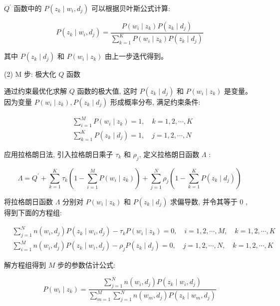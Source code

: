 \documentclass[10pt]{article}
\begin{document}
$Q^{\prime}$ 函数中的 $P\left(z_{k} \mid w_{i}, d_{j}\right)$ 可以根据贝叶斯公式计算:


\begin{equation*}
P\left(z_{k} \mid w_{i}, d_{j}\right)=\frac{P\left(w_{i} \mid z_{k}\right) P\left(z_{k} \mid d_{j}\right)}{\sum_{k=1}^{K} P\left(w_{i} \mid z_{k}\right) P\left(z_{k} \mid d_{j}\right)} \tag{18.11}
\end{equation*}


其中 $P\left(z_{k} \mid d_{j}\right)$ 和 $P\left(w_{i} \mid z_{k}\right)$ 由上一步迭代得到。

(2) $\mathrm{M}$ 步: 极大化 $Q$ 函数

通过约束最优化求解 $Q$ 函数的极大值, 这时 $P\left(z_{k} \mid d_{j}\right)$ 和 $P\left(w_{i} \mid z_{k}\right)$ 是变量。因为变量 $P\left(w_{i} \mid z_{k}\right), P\left(z_{k} \mid d_{j}\right)$ 形成概率分布, 满足约束条件:

$$
\begin{aligned}
& \sum_{i=1}^{M} P\left(w_{i} \mid z_{k}\right)=1, \quad k=1,2, \cdots, K \\
& \sum_{k=1}^{K} P\left(z_{k} \mid d_{j}\right)=1, \quad j=1,2, \cdots, N
\end{aligned}
$$

应用拉格朗日法, 引入拉格朗日乘子 $\tau_{k}$ 和 $\rho_{j}$, 定义拉格朗日函数 $\Lambda$ :

$$
\Lambda=Q^{\prime}+\sum_{k=1}^{K} \tau_{k}\left(1-\sum_{i=1}^{M} P\left(w_{i} \mid z_{k}\right)\right)+\sum_{j=1}^{N} \rho_{j}\left(1-\sum_{k=1}^{K} P\left(z_{k} \mid d_{j}\right)\right)
$$

将拉格朗日函数 $\Lambda$ 分别对 $P\left(w_{i} \mid z_{k}\right)$ 和 $P\left(z_{k} \mid d_{j}\right)$ 求偏导数, 并令其等于 0 , 得到下面的方程组:

$$
\begin{aligned}
& \sum_{j=1}^{N} n\left(w_{i}, d_{j}\right) P\left(z_{k} \mid w_{i}, d_{j}\right)-\tau_{k} P\left(w_{i} \mid z_{k}\right)=0, \quad i=1,2, \cdots, M, \quad k=1,2, \cdots, K \\
& \sum_{i=1}^{M} n\left(w_{i}, d_{j}\right) P\left(z_{k} \mid w_{i}, d_{j}\right)-\rho_{j} P\left(z_{k} \mid d_{j}\right)=0, \quad j=1,2, \cdots, N, \quad k=1,2, \cdots, K
\end{aligned}
$$

解方程组得到 $M$ 步的参数估计公式:


\begin{equation*}
P\left(w_{i} \mid z_{k}\right)=\frac{\sum_{j=1}^{N} n\left(w_{i}, d_{j}\right) P\left(z_{k} \mid w_{i}, d_{j}\right)}{\sum_{m=1}^{M} \sum_{j=1}^{N} n\left(w_{m}, d_{j}\right) P\left(z_{k} \mid w_{m}, d_{j}\right)} \tag{18.12}
\end{equation*}
\end{document}
